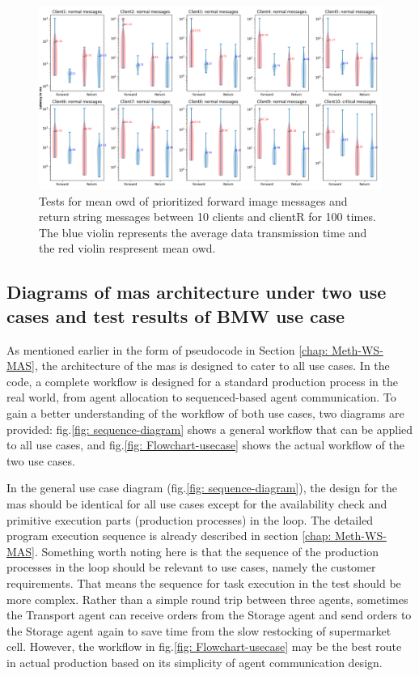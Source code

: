 \begin{figure}
    \includegraphics[width=\textheight]{figures/tests/priority_tests/log_violin_10clients_image_priority.png}\hfill 
    \caption{Tests for mean \gls{owd} of prioritized forward image messages and return string messages between 10 clients 
    and clientR for 100 times. The blue violin represents the average data transmission time and the red violin 
    respresent mean \gls{owd}.} \label{fig: priority-10clients-d}
\end{figure}


\subsection{Diagrams of \gls{mas} architecture under two use cases and 
test results of BMW use case}\label{chap: Result-Internal-Usecase}

As mentioned earlier in the form of pseudocode in Section \ref{chap: Meth-WS-MAS}, 
the architecture of the \gls{mas} is designed to cater to all use cases. In the code, 
a complete workflow is designed for a standard production process in the real world, 
from agent allocation to sequenced-based agent communication. To gain a better 
understanding of the workflow of both use cases, two diagrams are provided: 
fig.\ref{fig: sequence-diagram} shows a general workflow that can be applied to all
use cases, and fig.\ref{fig: Flowchart-usecase} shows the actual workflow of the 
two use cases.


In the general use case diagram (fig.\ref{fig: sequence-diagram}), the 
design for the \gls{mas} should be identical for all use cases except for 
the availability check and primitive execution parts (production processes) in the loop. 
The detailed program execution sequence is already described in 
section \ref{chap: Meth-WS-MAS}. Something worth noting here is that the sequence 
of the production processes in the loop should be relevant to use cases, namely the 
customer requirements. That means the sequence for task execution in the test should 
be more complex. Rather than a simple round trip between three agents, sometimes the 
Transport agent can receive orders from the Storage agent and send orders to the Storage 
agent again to save time from the slow restocking of supermarket cell. However, 
the workflow in fig.\ref{fig: Flowchart-usecase} may be the best route in actual 
production based on its simplicity of agent communication design.  

